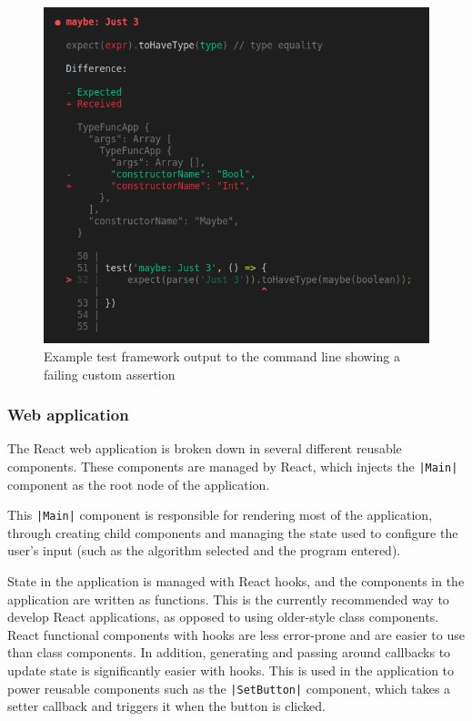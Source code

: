 \documentclass[a4paper,fleqn,12pt]{article}
\begin{document}
{\centering \begin{figure}[h!]
  \centering
  \includegraphics[width=0.769\linewidth]{images/image8.png}
  \caption{Example test framework output to the command line showing a failing custom assertion}
\end{figure} \par}
\subsubsection{Web application}\label{id:h.jqmg1n3w35mp}
The React web application is broken down in several different reusable components. These components are managed by React, which injects the \texttt{|Main|} component as the root node of the application.

This \texttt{|Main|} component is responsible for rendering most of the application, through creating child components and managing the state used to configure the user’s input (such as the algorithm selected and the program entered).

State in the application is managed with React hooks, and the components in the application are written as functions. This is the currently recommended way to develop React applications, as opposed to using older-style class components. React functional components with hooks are less error-prone and are easier to use than class components. In addition, generating and passing around callbacks to update state is significantly easier with hooks. This is used in the application to power reusable components such as the \texttt{|SetButton|} component, which takes a setter callback and triggers it when the button is clicked.
\end{document}
